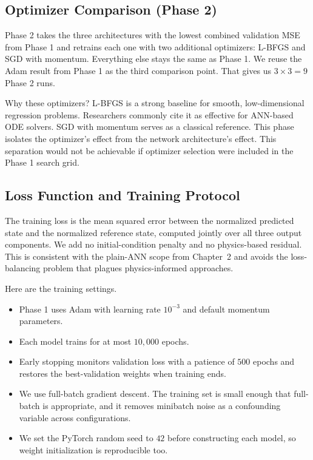 \subsection{Optimizer Comparison (Phase 2)}

Phase 2 takes the three architectures with the lowest combined validation MSE from Phase 1 and retrains each one with two additional optimizers: L-BFGS and SGD with momentum. Everything else stays the same as Phase 1. We reuse the Adam result from Phase 1 as the third comparison point. That gives us $3 \times 3 = 9$ Phase 2 runs.

Why these optimizers? L-BFGS is a strong baseline for smooth, low-dimensional regression problems. Researchers commonly cite it as effective for ANN-based ODE solvers. SGD with momentum serves as a classical reference. This phase isolates the optimizer's effect from the network architecture's effect. This separation would not be achievable if optimizer selection were included in the Phase 1 search grid.

\subsection{Loss Function and Training Protocol}

The training loss is the mean squared error between the normalized predicted state and the normalized reference state, computed jointly over all three output components. We add no initial-condition penalty and no physics-based residual. This is consistent with the plain-ANN scope from Chapter~2 and avoids the loss-balancing problem that plagues physics-informed approaches.

Here are the training settings.

\begin{itemize}
    \item Phase 1 uses Adam with learning rate $10^{-3}$ and default momentum parameters.
    \item Each model trains for at most $10{,}000$ epochs.
    \item Early stopping monitors validation loss with a patience of $500$ epochs and restores the best-validation weights when training ends.
    \item We use full-batch gradient descent. The training set is small enough that full-batch is appropriate, and it removes minibatch noise as a confounding variable across configurations.
    \item We set the PyTorch random seed to $42$ before constructing each model, so weight initialization is reproducible too.
\end{itemize}

